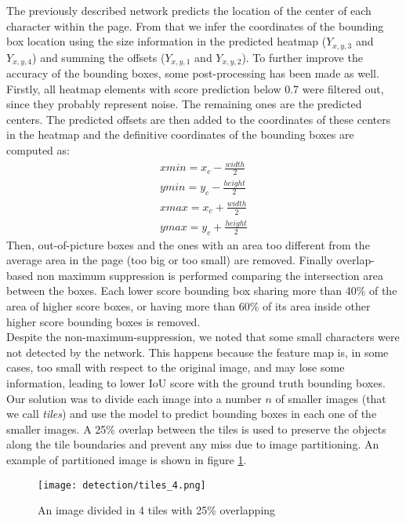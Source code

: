 The previously described network predicts the location of the center of each character within the page. From that we infer the coordinates of the bounding box location using the size information in the predicted heatmap ($Y_{x,y,3}$ and $Y_{x,y,4}$) and summing the offsets ($Y_{x,y,1}$ and $Y_{x,y,2}$). To further improve the accuracy of the bounding boxes, some post-processing has been made as well. Firstly, all heatmap elements with score prediction below 0.7 were filtered out, since they probably represent noise. The remaining ones are the predicted centers. The predicted offsets are then added to the coordinates of these centers in the heatmap and the definitive coordinates of the bounding boxes are computed as:
\begin{eqnarray*}
	xmin=x_c - \frac{width}{2}\\
	ymin= y_c - \frac{height}{2}\\
	xmax=x_c + \frac{width}{2}\\
	ymax=y_c + \frac{height}{2}
\end{eqnarray*}
Then, out-of-picture boxes and the ones with an area too different from the average area in the page (too big or too small) are removed. Finally overlap-based non maximum suppression is performed comparing the intersection area between the boxes. Each lower score bounding box sharing more than 40\% of the area of higher score boxes, or having more than 60\% of its area inside other higher score bounding boxes is removed.\\

\noindent Despite the non-maximum-suppression, we noted that some small characters were not detected by the network. This happens because the feature map is, in some cases, too small with respect to the original image, and may lose some information, leading to lower IoU score with the ground truth bounding boxes. 
Our solution was to divide each image into a number $n$ of smaller images (that we call \textit{tiles}) and use the model to predict bounding boxes in each one of the smaller images. A 25\% overlap between the tiles is used to preserve the objects along the tile boundaries and prevent any miss due to image partitioning. An example of partitioned image is shown in figure \ref{fig:tiles4}.

\begin{figure}
	\centering
	\texttt{[image: detection/tiles\_4.png]}
	\caption{An image divided in 4 tiles with 25\% overlapping}
	\label{fig:tiles4}
\end{figure}

